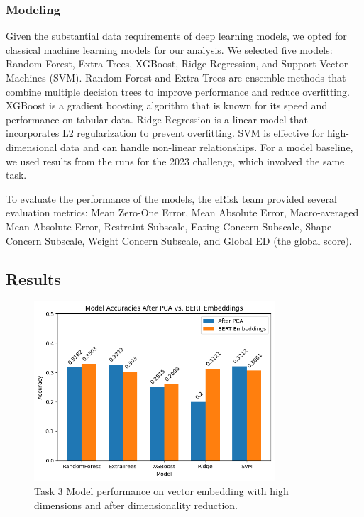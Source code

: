 \documentclass[]{style/ceurart}
\begin{document}
\subsubsection{Modeling}

Given the substantial data requirements of deep learning models, we opted for classical machine learning models for our analysis.
We selected five models: Random Forest, Extra Trees, XGBoost, Ridge Regression, and Support Vector Machines (SVM).
Random Forest and Extra Trees are ensemble methods that combine multiple decision trees to improve performance and reduce overfitting.
XGBoost is a gradient boosting algorithm that is known for its speed and performance on tabular data.
Ridge Regression is a linear model that incorporates L2 regularization to prevent overfitting.
SVM is effective for high-dimensional data and can handle non-linear relationships.
For a model baseline, we used results from the runs for the 2023 challenge, which involved the same task.

To evaluate the performance of the models, the eRisk team provided several evaluation metrics: Mean Zero-One Error, Mean Absolute Error, Macro-averaged Mean Absolute Error, Restraint Subscale, Eating Concern Subscale, Shape Concern Subscale, Weight Concern Subscale, and Global ED (the global score).

\subsection{Results}


\begin{figure}[h]
  \centering
  \includegraphics[width=0.8\textwidth]{task3ModelRes.png}
  \caption{Task 3 Model performance on vector embedding with high dimensions and after dimensionality reduction.}
  \label{fig:example}
\end{figure}
\end{document}
